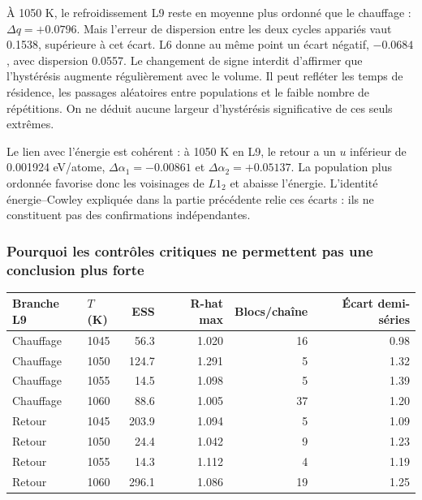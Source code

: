 À 1050 K, le refroidissement L9 reste en moyenne plus ordonné que le chauffage : $\Delta q=+0.0796$. Mais l’erreur de dispersion entre les deux cycles appariés vaut 0.1538, supérieure à cet écart. L6 donne au même point un écart négatif, $-0.0684$, avec dispersion 0.0557. Le changement de signe interdit d’affirmer que l’hystérésis augmente régulièrement avec le volume. Il peut refléter les temps de résidence, les passages aléatoires entre populations et le faible nombre de répétitions. On ne déduit aucune largeur d’hystérésis significative de ces seuls extrêmes.

Le lien avec l’énergie est cohérent : à 1050 K en L9, le retour a un $u$ inférieur de 0.001924 eV/atome, $\Delta\alpha_1=-0.00861$ et $\Delta\alpha_2=+0.05137$. La population plus ordonnée favorise donc les voisinages de $L1_2$ et abaisse l’énergie. L’identité énergie--Cowley expliquée dans la partie précédente relie ces écarts : ils ne constituent pas des confirmations indépendantes.

\subsubsection{Pourquoi les contrôles critiques ne permettent pas une conclusion plus forte}

\begin{center}\small\begin{tabular}{llrrrr}\toprule

Branche L9 & $T$ (K) & ESS & R-hat max & Blocs/chaîne & Écart demi-séries\\\midrule

Chauffage & 1045 & 56.3 & 1.020 & 16 & 0.98\\

Chauffage & 1050 & 124.7 & 1.291 & 5 & 1.32\\

Chauffage & 1055 & 14.5 & 1.098 & 5 & 1.39\\

Chauffage & 1060 & 88.6 & 1.005 & 37 & 1.20\\

Retour & 1045 & 203.9 & 1.094 & 5 & 1.09\\

Retour & 1050 & 24.4 & 1.042 & 9 & 1.23\\

Retour & 1055 & 14.3 & 1.112 & 4 & 1.19\\

Retour & 1060 & 296.1 & 1.086 & 19 & 1.25\\

\bottomrule\end{tabular}\end{center}

